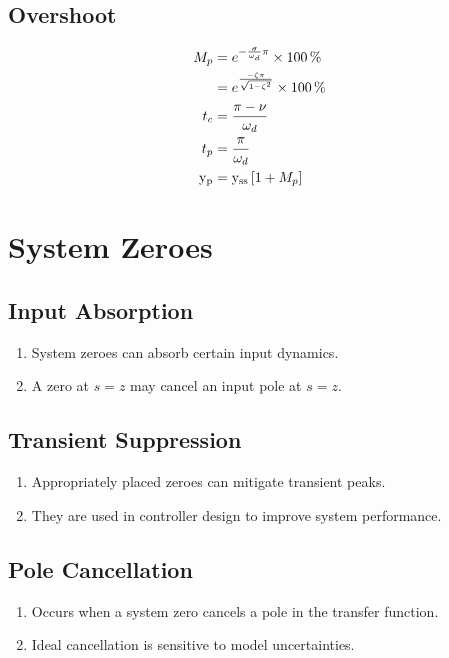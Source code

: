 \documentclass[8pt]{extarticle}
\begin{document}
\begin{multicols*}{3}
\subsection*{Overshoot}
\begin{align*}
    M_p &= e^{-\frac{\sigma}{\omega_d} \pi} \times \qty{100}{\percent} \\
        &= e^{\frac{-\zeta \pi}{\sqrt{1 - \zeta^2}}} \times \qty{100}{\percent} \\
    t_c &= \frac{\pi - \nu}{\omega_d} \\
    t_p &= \frac{\pi}{\omega_d} \\
    \func{y_p} &= \func{y_{ss}} \left[1+M_p\right]
\end{align*}

\section*{System Zeroes}
\subsection*{Input Absorption}
\begin{enumerate}
    \item System zeroes can absorb certain input dynamics.
    \item A zero at \( s = z \) may cancel an input pole at \( s = z \).
\end{enumerate}

\subsection*{Transient Suppression}
\begin{enumerate}
    \item Appropriately placed zeroes can mitigate transient peaks.
    \item They are used in controller design to improve system performance.
\end{enumerate}

\subsection*{Pole Cancellation}
\begin{enumerate}
    \item Occurs when a system zero cancels a pole in the transfer function.
    \item Ideal cancellation is sensitive to model uncertainties.
\end{enumerate}


\end{multicols*}
\end{document}
